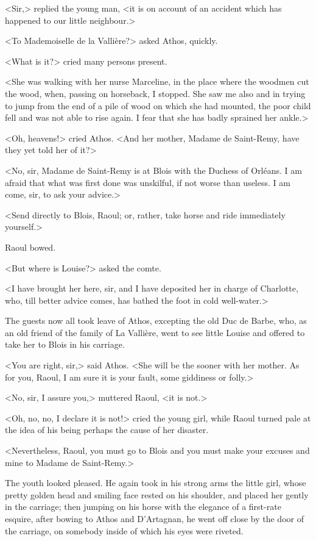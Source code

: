 <Sir,> replied the young man, <it is on account of an accident which has happened to our little neighbour.>

<To Mademoiselle de la Vallière?> asked Athos, quickly.

<What is it?> cried many persons present.

<She was walking with her nurse Marceline, in the place where the woodmen cut the wood, when, passing on horseback, I stopped. She saw me also and in trying to jump from the end of a pile of wood on which she had mounted, the poor child fell and was not able to rise again. I fear that she has badly sprained her ankle.>

<Oh, heavens!> cried Athos. <And her mother, Madame de Saint-Remy, have they yet told her of it?>

<No, sir, Madame de Saint-Remy is at Blois with the Duchess of Orléans. I am afraid that what was first done was unskilful, if not worse than useless. I am come, sir, to ask your advice.>

<Send directly to Blois, Raoul; or, rather, take horse and ride immediately yourself.>

Raoul bowed.

<But where is Louise?> asked the comte.

<I have brought her here, sir, and I have deposited her in charge of Charlotte, who, till better advice comes, has bathed the foot in cold well-water.>

The guests now all took leave of Athos, excepting the old Duc de Barbe, who, as an old friend of the family of La Vallière, went to see little Louise and offered to take her to Blois in his carriage.

<You are right, sir,> said Athos. <She will be the sooner with her mother. As for you, Raoul, I am sure it is your fault, some giddiness or folly.>

<No, sir, I assure you,> muttered Raoul, <it is not.>

<Oh, no, no, I declare it is not!> cried the young girl, while Raoul turned pale at the idea of his being perhaps the cause of her disaster.

<Nevertheless, Raoul, you must go to Blois and you must make your excuses and mine to Madame de Saint-Remy.>

The youth looked pleased. He again took in his strong arms the little girl, whose pretty golden head and smiling face rested on his shoulder, and placed her gently in the carriage; then jumping on his horse with the elegance of a first-rate esquire, after bowing to Athos and D'Artagnan, he went off close by the door of the carriage, on somebody inside of which his eyes were riveted. 